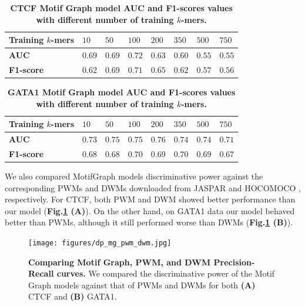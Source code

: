 \documentclass[a4paper, titlepage, openright]{book}
\newcommand{\motifgraph}{MotifGraph\xspace}
\begin{document}
\begin{table}
	\centering
	\begin{tabular}{|p{3cm}|p{}|p{}|p{}|p{}|p{}|p{}|p{}|}
		\hline
		\textbf{Training $k$-mers}& \textbf{$10$}& \textbf{$50$}& \textbf{$100$}& \textbf{$200$}& \textbf{$350$}& \textbf{$500$}& \textbf{$750$} \\
		\hline
		\textbf{AUC}& $0.69$& $0.69$& $0.72$& $0.63$& $0.60$& $0.55$& $0.55$\\
		\hline
		\textbf{F1-score}& $0.62$& $0.69$& $0.71$& $0.65$& $0.62$& $0.57$& $0.56$\\
		\hline
	\end{tabular}
	\caption[CTCF Motif Graph model AUC and F1-scores values with different number of training $k$-mers.]{\textbf{CTCF Motif Graph model AUC and F1-scores values with different number of training $k$-mers.}}
	\label{table:ctcf_auc_f1}
\end{table}
\begin{table}
	\centering
	\begin{tabular}{|p{3cm}|p{}|p{}|p{}|p{}|p{}|p{}|p{}|}
		\hline
		\textbf{Training $k$-mers}& \textbf{$10$}& \textbf{$50$}& \textbf{$100$}& \textbf{$200$}& \textbf{$350$}& \textbf{$500$}& \textbf{$750$} \\
		\hline
		\textbf{AUC}& $0.73$& $0.75$& $0.75$& $0.76$& $0.74$& $0.74$& $0.71$\\
		\hline
		\textbf{F1-score}& $0.68$& $0.68$& $0.70$& $0.69$& $0.70$& $0.69$& $0.67$\\
		\hline
	\end{tabular}
	\caption[GATA1 Motif Graph model AUC and F1-scores values with different number of training $k$-mers.]{\textbf{GATA1 Motif Graph model AUC and F1-scores values with different number of training $k$-mers.}}
	\label{table:gata1_auc_f1}
\end{table}
We also compared \motifgraph models discriminative power against the corresponding PWMs and DWMs downloaded from JASPAR \citep{sandelin2004jaspar} and HOCOMOCO \citep{kulakovskiy2016hocomoco}, respectively. For CTCF, both PWM and DWM showed better performance than our model (\textbf{Fig.\ref{fig:dp_mg_pwm_dwm} (A)}). On the other hand, on GATA1 data our model behaved better than PWMs, although it still performed worse than DWMs (\textbf{Fig.\ref{fig:dp_mg_pwm_dwm} (B)}).
\begin{figure}
	\centering
	\texttt{[image: figures/dp\_mg\_pwm\_dwm.jpg]}
	\caption[Comparing Motif Graph, PWM, and DWM Precision-Recall curves.]{\textbf{Comparing Motif Graph, PWM, and DWM Precision-Recall curves.} We compared the discriminative power of the Motif Graph models against that of PWMs and DWMs for both \textbf{(A)} CTCF and \textbf{(B)} GATA1.}
	\label{fig:dp_mg_pwm_dwm}
\end{figure} 
\end{document}
